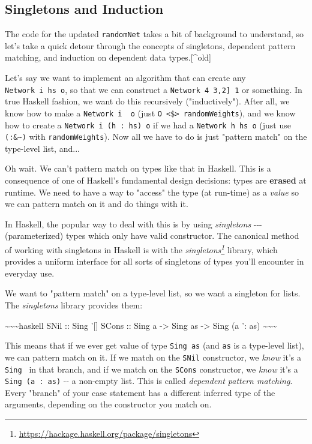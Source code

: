 \documentclass[]{article}
\renewcommand{\href}[2]{#2\footnote{\url{#1}}}
\begin{document}
\subsection{Singletons and Induction}

The code for the updated \texttt{randomNet} takes a bit of background to
understand, so let's take a quick detour through the concepts of singletons,
dependent pattern matching, and induction on dependent data types.{[}\^{}old{]}

Let's say we want to implement an algorithm that can create any
\texttt{Network\ i\ hs\ o}, so that we can construct a
\texttt{Network\ 4\ \textquotesingle{}{[}3,2{]}\ 1} or something. In true
Haskell fashion, we want do this recursively ("inductively"). After all, we know
how to make a \texttt{Network\ i\ \textquotesingle{}{[}{]}\ o} (just
\texttt{O\ \textless{}\$\textgreater{}\ randomWeights}), and we know how to
create a \texttt{Network\ i\ (h\ \textquotesingle{}:\ hs)\ o} if we had a
\texttt{Network\ h\ hs\ o} (just use \texttt{(:\&\textasciitilde{})} with
\texttt{randomWeights}). Now all we have to do is just "pattern match" on the
type-level list, and...

Oh wait. We can't pattern match on types like that in Haskell. This is a
consequence of one of Haskell's fundamental design decisions: types are
\textbf{erased} at runtime. We need to have a way to "access" the type (at
run-time) as a \emph{value} so we can pattern match on it and do things with it.

In Haskell, the popular way to deal with this is by using \emph{singletons}
-\/-\/- (parameterized) types which only have valid constructor. The canonical
method of working with singletons in Haskell is with the
\emph{\href{https://hackage.haskell.org/package/singletons}{singletons}}
library, which provides a uniform interface for all sorts of singletons of types
you'll encounter in everyday use.

We want to "pattern match" on a type-level list, so we want a singleton for
lists. The \emph{singletons} library provides them:

\textasciitilde{}\textasciitilde{}\textasciitilde{}haskell SNil :: Sing '{[}{]}
SCons :: Sing a -\textgreater{} Sing as -\textgreater{} Sing (a ': as)
\textasciitilde{}\textasciitilde{}\textasciitilde{}

This means that if we ever get value of type \texttt{Sing\ as} (and \texttt{as}
is a type-level list), we can pattern match on it. If we match on the
\texttt{SNil} constructor, we \emph{know} it's a
\texttt{Sing\ \textquotesingle{}{[}{]}} in that branch, and if we match on the
\texttt{SCons} constructor, we \emph{know} it's a
\texttt{Sing\ (a\ \textquotesingle{}:\ as)} -\/- a non-empty list. This is
called \emph{dependent pattern matching}. Every "branch" of your case statement
has a different inferred type of the arguments, depending on the constructor you
match on.
\end{document}
